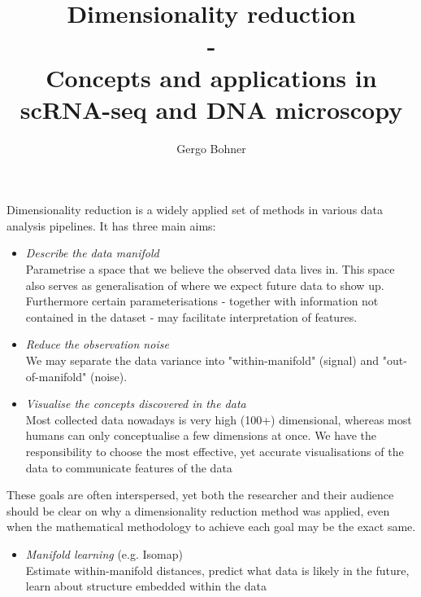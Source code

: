 \documentclass[11pt]{article}
\title{Dimensionality reduction \\ - \\ Concepts and applications in scRNA-seq and DNA microscopy}
\author{Gergo Bohner}
\begin{document}
\maketitle


Dimensionality reduction is a widely applied set of methods in various data analysis pipelines. It has three main aims:

\begin{itemize}
	\item \emph{Describe the data manifold} \\ Parametrise a space that we believe the observed data lives in. This space also serves as generalisation of where we expect future data to show up. Furthermore certain parameterisations - together with information not contained in the dataset - may facilitate interpretation of features.
	\item \emph{Reduce the observation noise} \\ We may separate the data variance into "within-manifold" (signal) and "out-of-manifold" (noise).
	\item \emph{Visualise the concepts discovered in the data} \\ Most collected data nowadays is very high (100+) dimensional, whereas most humans can only conceptualise a few dimensions at once. We have the responsibility to choose the most effective, yet accurate visualisations of the data to communicate features of the data
\end{itemize} 

These goals are often interspersed, yet both the researcher and their audience should be clear on why a dimensionality reduction method was applied, even when the mathematical methodology to achieve each goal may be the exact same.


\begin{itemize}
	\item \emph{Manifold learning} (e.g. Isomap) \\ Estimate within-manifold distances, predict what data is likely in the future, learn about structure embedded within the data
\end{itemize}
\end{document}
